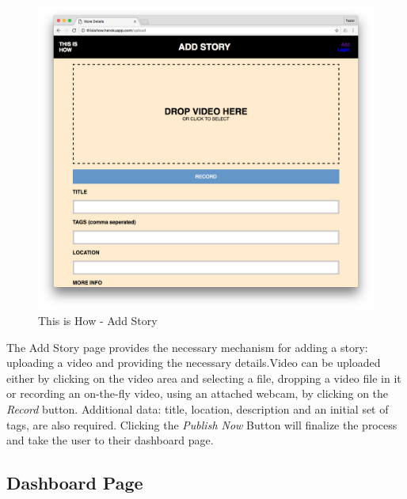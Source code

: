    \begin{figure}[thpb]
      \centering
      \includegraphics[width=\textwidth]{figures/addstory.png}
      \caption{This is How - Add Story}
      \label{fig_add_story}
   \end{figure}

The Add Story page provides the necessary mechanism for adding a story: uploading a video and providing the necessary details.Video can be uploaded either by clicking on the video area and selecting a file, dropping a video file in it or recording an on-the-fly video, using an attached webcam, by clicking on the \textit{Record} button. Additional data: title, location, description and an initial set of tags, are also required. Clicking the \textit{Publish Now} Button will finalize the process and take the user to their dashboard page. 

\subsection{Dashboard Page}

